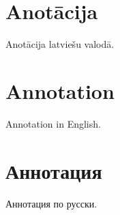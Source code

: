 \section*{Anotācija}
Anotācija latviešu valodā.

\section*{Annotation}
Annotation in English.

\section*{Аннотация}
Аннотация по русски.


